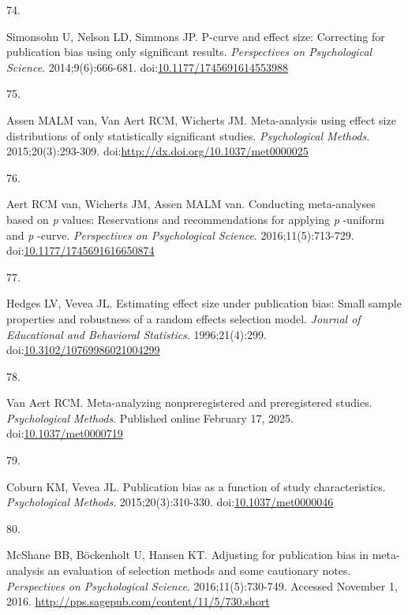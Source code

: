\documentclass[
  man, donotrepeattitle,floatsintext]{apa7}
\newlength{\cslhangindent}
\newlength{\csllabelwidth}
\newenvironment{CSLReferences}[2] %
 {\begin{list}{}{%
  \setlength{\itemindent}{0pt}
  \setlength{\leftmargin}{0pt}
  \setlength{\parsep}{0pt}
  \ifodd #1
   \setlength{\leftmargin}{\cslhangindent}
   \setlength{\itemindent}{-1\cslhangindent}
  \fi
  \setlength{\itemsep}{#2\baselineskip}}}
 {\end{list}}
\newcommand{\CSLLeftMargin}[1]{\parbox[t]{\csllabelwidth}{\strut#1\strut}}
\newcommand{\CSLRightInline}[1]{\parbox[t]{\linewidth - \csllabelwidth}{\strut#1\strut}}
\begin{document}
\begin{CSLReferences}{0}{1}
\CSLLeftMargin{74. }%
\CSLRightInline{Simonsohn U, Nelson LD, Simmons JP. P-curve and effect size: Correcting for publication bias using only significant results. \emph{Perspectives on Psychological Science}. 2014;9(6):666-681. doi:\href{https://doi.org/10.1177/1745691614553988}{10.1177/1745691614553988}}

\CSLLeftMargin{75. }%
\CSLRightInline{Assen MALM van, Van Aert RCM, Wicherts JM. {Meta-analysis using effect size distributions of only statistically significant studies}. \emph{Psychological Methods}. 2015;20(3):293-309. doi:\url{http://dx.doi.org/10.1037/met0000025}}

\CSLLeftMargin{76. }%
\CSLRightInline{Aert RCM van, Wicherts JM, Assen MALM van. Conducting meta-analyses based on \emph{p} values: Reservations and recommendations for applying \emph{p} -uniform and \emph{p} -curve. \emph{Perspectives on Psychological Science}. 2016;11(5):713-729. doi:\href{https://doi.org/10.1177/1745691616650874}{10.1177/1745691616650874}}

\CSLLeftMargin{77. }%
\CSLRightInline{Hedges LV, Vevea JL. {Estimating effect size under publication bias: Small sample properties and robustness of a random effects selection model}. \emph{Journal of Educational and Behavioral Statistics}. 1996;21(4):299. doi:\href{https://doi.org/10.3102/10769986021004299}{10.3102/10769986021004299}}

\CSLLeftMargin{78. }%
\CSLRightInline{Van Aert RCM. Meta-analyzing nonpreregistered and preregistered studies. \emph{Psychological Methods}. Published online February 17, 2025. doi:\href{https://doi.org/10.1037/met0000719}{10.1037/met0000719}}

\CSLLeftMargin{79. }%
\CSLRightInline{Coburn KM, Vevea JL. {Publication bias as a function of study characteristics}. \emph{Psychological Methods}. 2015;20(3):310-330. doi:\href{https://doi.org/10.1037/met0000046}{10.1037/met0000046}}

\CSLLeftMargin{80. }%
\CSLRightInline{McShane BB, Böckenholt U, Hansen KT. Adjusting for publication bias in meta-analysis an evaluation of selection methods and some cautionary notes. \emph{Perspectives on Psychological Science}. 2016;11(5):730-749. Accessed November 1, 2016. \url{http://pps.sagepub.com/content/11/5/730.short}}

\end{CSLReferences}

\endgroup
\end{document}
